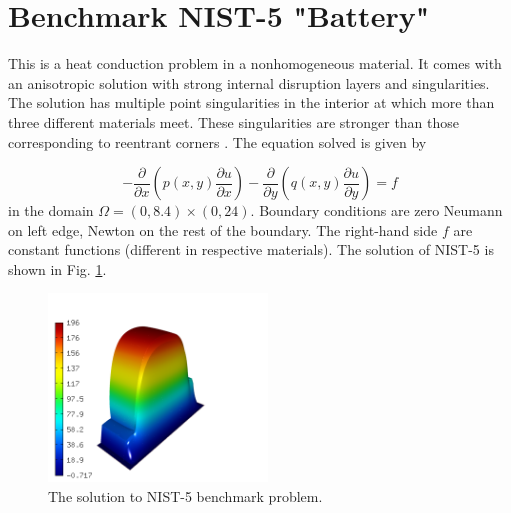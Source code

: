 \documentclass[12pt]{elsarticle}
\begin{document}

\section{Benchmark NIST-5 "Battery"}
\label{sec:bench-5}

This is a heat conduction problem in a nonhomogeneous material.
It comes with an anisotropic solution with strong internal disruption
layers and singularities.
The solution has multiple point singularities in the interior at which
more than three different materials meet. These singularities are stronger than those
corresponding to reentrant corners \cite{demkowicz-1}.
The equation solved is given by

\begin{equation} \label{heat-conduction}
-\frac{\partial }{\partial x}\left(p(x, y)\frac{\partial u}{\partial x}\right)
-\frac{\partial }{\partial y}\left(q(x, y)\frac{\partial u}{\partial y}\right) = f
\end{equation}
in the domain $\Omega = (0, 8.4) \times (0, 24)$. Boundary conditions are zero Neumann on left edge, Newton on the rest of the boundary.
The right-hand side $f$ are constant functions (different in respective materials).
The solution of NIST-5 is shown in Fig. \ref{fig:sln-nist05}.

\begin{figure}[!ht]
\centering
\includegraphics[height=5cm]{nist/nist-5/solution.png}
\caption{The solution to NIST-5 benchmark problem.}
\label{fig:sln-nist05}
\end{figure}
\end{document}
